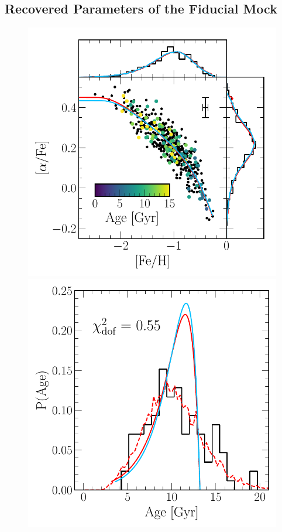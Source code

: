 \documentclass[ms.tex]{subfiles}
\begin{document}
\subsection{Recovered Parameters of the Fiducial Mock}
\label{sec:mocks:fiducial_fit}

\begin{figure}
\centering
\includegraphics[scale = 0.5]{fiducial_mock_afe_feh.pdf}
\includegraphics[scale = 0.42]{fiducial_mock_agedist.pdf}

\end{figure}
\end{document}
